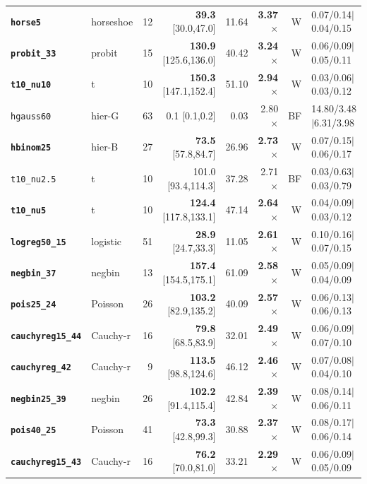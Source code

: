 {\begin{longtable}{llrrrrrl}
\textbf{\texttt{horse5}} & horseshoe & 12 & \textbf{39.3} [30.0,47.0] & 11.64 & \textbf{3.37$\times$} & W & 0.07/0.14$\mid$0.04/0.15\\
\textbf{\texttt{probit\_33}} & probit & 15 & \textbf{130.9} [125.6,136.0] & 40.42 & \textbf{3.24$\times$} & W & 0.06/0.09$\mid$0.05/0.11\\
\textbf{\texttt{t10\_nu10}} & t & 10 & \textbf{150.3} [147.1,152.4] & 51.10 & \textbf{2.94$\times$} & W & 0.03/0.06$\mid$0.03/0.12\\
\texttt{hgauss60} & hier-G & 63 & 0.1 [0.1,0.2] & 0.03 & 2.80$\times$ & BF & 14.80/3.48$\mid$6.31/3.98\\
\textbf{\texttt{hbinom25}} & hier-B & 27 & \textbf{73.5} [57.8,84.7] & 26.96 & \textbf{2.73$\times$} & W & 0.07/0.15$\mid$0.06/0.17\\
\texttt{t10\_nu2.5} & t & 10 & 101.0 [93.4,114.3] & 37.28 & 2.71$\times$ & BF & 0.03/0.63$\mid$0.03/0.79\\
\textbf{\texttt{t10\_nu5}} & t & 10 & \textbf{124.4} [117.8,133.1] & 47.14 & \textbf{2.64$\times$} & W & 0.04/0.09$\mid$0.03/0.12\\
\textbf{\texttt{logreg50\_15}} & logistic & 51 & \textbf{28.9} [24.7,33.3] & 11.05 & \textbf{2.61$\times$} & W & 0.10/0.16$\mid$0.07/0.15\\
\textbf{\texttt{negbin\_37}} & negbin & 13 & \textbf{157.4} [154.5,175.1] & 61.09 & \textbf{2.58$\times$} & W & 0.05/0.09$\mid$0.04/0.09\\
\textbf{\texttt{pois25\_24}} & Poisson & 26 & \textbf{103.2} [82.9,135.2] & 40.09 & \textbf{2.57$\times$} & W & 0.06/0.13$\mid$0.06/0.13\\
\textbf{\texttt{cauchyreg15\_44}} & Cauchy-r & 16 & \textbf{79.8} [68.5,83.9] & 32.01 & \textbf{2.49$\times$} & W & 0.06/0.09$\mid$0.07/0.10\\
\textbf{\texttt{cauchyreg\_42}} & Cauchy-r & 9 & \textbf{113.5} [98.8,124.6] & 46.12 & \textbf{2.46$\times$} & W & 0.07/0.08$\mid$0.04/0.10\\
\textbf{\texttt{negbin25\_39}} & negbin & 26 & \textbf{102.2} [91.4,115.4] & 42.84 & \textbf{2.39$\times$} & W & 0.08/0.14$\mid$0.06/0.11\\
\textbf{\texttt{pois40\_25}} & Poisson & 41 & \textbf{73.3} [42.8,99.3] & 30.88 & \textbf{2.37$\times$} & W & 0.08/0.17$\mid$0.06/0.14\\
\textbf{\texttt{cauchyreg15\_43}} & Cauchy-r & 16 & \textbf{76.2} [70.0,81.0] & 33.21 & \textbf{2.29$\times$} & W & 0.06/0.09$\mid$0.05/0.09\\

\end{longtable}}
